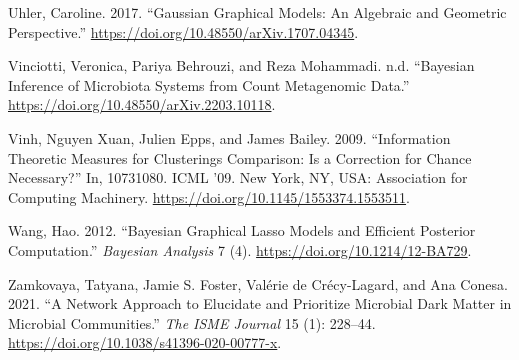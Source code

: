\documentclass[
  a4paper,
]{article}
\newlength{\cslhangindent}
\newlength{\cslentryspacingunit} %
\newenvironment{CSLReferences}[2] %
 {%
  \setlength{\parindent}{0pt}
  \ifodd #1
  \let\oldpar\par
  \def\par{\hangindent=\cslhangindent\oldpar}
  \fi
  \setlength{\parskip}{#2\cslentryspacingunit}
 }%
 {}
\begin{document}
\begin{CSLReferences}{1}{0}
\leavevmode{}%
Uhler, Caroline. 2017. {``Gaussian Graphical Models: An Algebraic and
Geometric Perspective.''}
\url{https://doi.org/10.48550/arXiv.1707.04345}.

\leavevmode{}%
Vinciotti, Veronica, Pariya Behrouzi, and Reza Mohammadi. n.d.
{``Bayesian Inference of Microbiota Systems from Count Metagenomic
Data.''} \url{https://doi.org/10.48550/arXiv.2203.10118}.

\leavevmode{}%
Vinh, Nguyen Xuan, Julien Epps, and James Bailey. 2009. {``Information
Theoretic Measures for Clusterings Comparison: Is a Correction for
Chance Necessary?''} In, 10731080. ICML '09. New York, NY, USA:
Association for Computing Machinery.
\url{https://doi.org/10.1145/1553374.1553511}.

\leavevmode{}%
Wang, Hao. 2012. {``Bayesian Graphical Lasso Models and Efficient
Posterior Computation.''} \emph{Bayesian Analysis} 7 (4).
\url{https://doi.org/10.1214/12-BA729}.

\leavevmode{}%
Zamkovaya, Tatyana, Jamie S. Foster, Valérie de Crécy-Lagard, and Ana
Conesa. 2021. {``A Network Approach to Elucidate and Prioritize
Microbial Dark Matter in Microbial Communities.''} \emph{The ISME
Journal} 15 (1): 228--44.
\url{https://doi.org/10.1038/s41396-020-00777-x}.

\end{CSLReferences}
\end{document}
